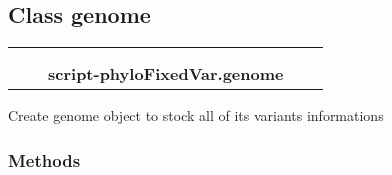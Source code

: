 

\subsection{Class genome}

    \label{script-phyloFixedVar:genome}
\begin{tabular}{cccccc}
\multicolumn{2}{r}{\settowidth{\BCL}{object}\multirow{2}{\BCL}{object}}
&&
  \\\cline{3-3}
  &&\multicolumn{1}{c|}{}
&&
  \\
&&\multicolumn{2}{l}{\textbf{script-phyloFixedVar.genome}}
\end{tabular}

Create genome object to stock all of its variants informations



  \subsubsection{Methods}

    \vspace{0.5ex}


